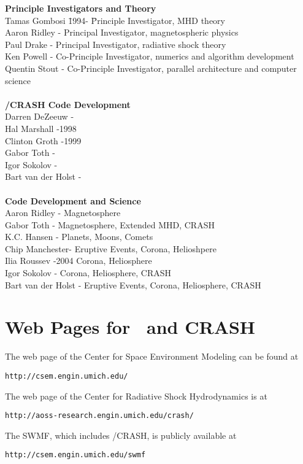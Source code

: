 \begin{tabbing}
{\bf Principle Investigators and Theory} \\
Tamas Gombosi \hspace{.25in} \= 1994- \hspace{0.35in} \= 
                          Principle Investigator, MHD theory \\
Aaron Ridley   -     \> Principal Investigator, magnetospheric physics \\
Paul Drake     -     \> Principal Investigator, radiative shock theory \\
Ken Powell     -     \> Co-Principle Investigator, numerics and algorithm development \\
Quentin Stout  -     \> Co-Principle Investigator, 
                          parallel architecture and computer science \\
\> \> \\
{\bf \BATSRUS/CRASH Code Development} \\
Darren DeZeeuw -     \>  \\
Hal Marshall   -1998 \>  \\
Clinton Groth  -1999 \>  \\ 
Gabor Toth     -     \>  \\
Igor Sokolov   -     \>  \\
Bart van der Holst - \>  \\
\> \> \\
{\bf Code Development and Science} \\
Aaron Ridley   -     \> Magnetosphere \\
Gabor Toth     -     \> Magnetosphere, Extended MHD, CRASH \\
K.C. Hansen    -     \> Planets, Moons, Comets \\
Chip Manchester-     \> Eruptive Events, Corona, Helioshpere \\
Ilia Roussev   -2004 \> Corona, Heliosphere \\
Igor Sokolov   -     \> Corona, Heliosphere, CRASH \\
Bart van der Holst - \> Eruptive Events, Corona, Heliosphere, CRASH \\
\end{tabbing}

\section{Web Pages for \BATSRUS\ and CRASH}
The web page of the Center for Space Environment Modeling can be found at
\begin{verbatim}
http://csem.engin.umich.edu/
\end{verbatim}
The web page of the Center for Radiative Shock Hydrodynamics is at
\begin{verbatim}
http://aoss-research.engin.umich.edu/crash/
\end{verbatim}
The SWMF, which includes \BATSRUS/CRASH, is publicly available at
\begin{verbatim}
http://csem.engin.umich.edu/swmf
\end{verbatim}
